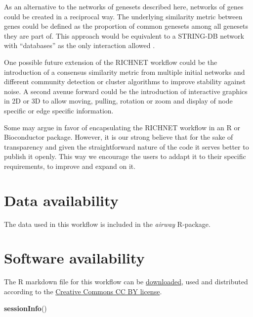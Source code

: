\documentclass[9pt,a4paper,]{extarticle}
\newenvironment{Shaded}{\begin{snugshade}}{\end{snugshade}}
\newcommand{\KeywordTok}[1]{\textcolor[rgb]{0.13,0.29,0.53}{\textbf{#1}}}
\newcommand{\NormalTok}[1]{#1}
\begin{document}
As an alternative to the networks of genesets described here, networks of genes could be created in a reciprocal way. The underlying similarity metric between genes could be defined as the proportion of common genesets among all genesets they are part of. This approach would be equivalent to a STRING-DB network with ``databases'' as the only interaction allowed \citep{Szklarczyk2017}.

One possible future extension of the RICHNET workflow could be the introduction of a consensus similarity metric from multiple initial networks and different community detection or cluster algorithms to improve stability against noise. A second avenue forward could be the introduction of interactive graphics in 2D or 3D \citep{Ognyanova2015} to allow moving, pulling, rotation or zoom and display of node specific or edge specific information.

Some may argue in favor of encapsulating the RICHNET workflow in an R or Bioconductor package. However, it is our strong believe that for the sake of transparency and given the straightforward nature of the code it serves better to publish it openly. This way we encourage the users to addapt it to their specific requirements, to improve and expand on it.

\section{Data availability}\label{data-availability}

The data used in this workflow is included in the \emph{airway} R-package\citep{Himes2014}.

\section{Software availability}\label{software-availability}

The R markdown file for this workflow can be \href{https://gitlab.ethz.ch/nexuscbu/richnet/tree/master/RICHNET_ms/RICHNET_ms.Rmd}{downloaded}, used and distributed according to the \href{https://creativecommons.org/licenses/by/4.0/}{Creative Commons CC BY license}.

\newpage 

\begin{Shaded}
\begin{Highlighting}[]
\KeywordTok{sessionInfo}\NormalTok{()}
\end{Highlighting}
\end{Shaded}
\end{document}
